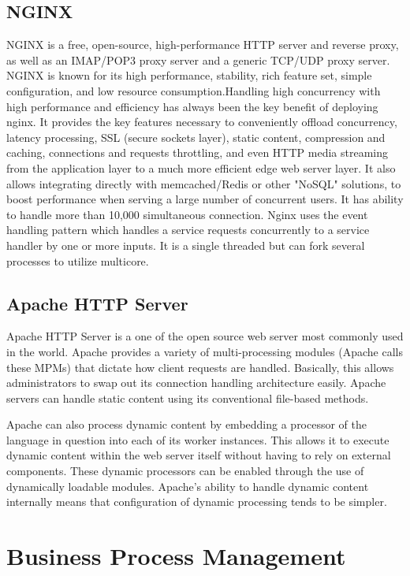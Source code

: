 \subsection{NGINX}
              NGINX is a free, open-source, high-performance HTTP server and reverse proxy, as well as an IMAP/POP3 proxy server and a generic TCP/UDP proxy server. NGINX is known for its high performance, stability, rich feature set, simple configuration, and low resource consumption.Handling high concurrency with high performance and efficiency has always been the key benefit of deploying nginx. It provides the key features necessary to conveniently offload concurrency, latency processing, SSL (secure sockets layer), static content, compression and caching, connections and requests throttling, and even HTTP media streaming from the application layer to a much more efficient edge web server layer. It also allows integrating directly with memcached/Redis or other "NoSQL" solutions, to boost performance when serving a large number of concurrent users. It has ability to handle more than 10,000 simultaneous connection. Nginx uses the event handling pattern which handles a service requests concurrently to a service handler by one or more inputs. It is a single threaded but can fork several processes to utilize multicore.
              

\subsection{Apache HTTP Server}
				Apache HTTP Server is a one of the open source web server most commonly used in the world. Apache provides a variety of multi-processing modules (Apache calls these MPMs) that dictate how client requests are handled. Basically, this allows administrators to swap out its connection handling architecture easily. Apache servers can handle static content using its conventional file-based methods. 
				
				Apache can also process dynamic content by embedding a processor of the language in question into each of its worker instances. This allows it to execute dynamic content within the web server itself without having to rely on external components. These dynamic processors can be enabled through the use of dynamically loadable modules. Apache's ability to handle dynamic content internally means that configuration of dynamic processing tends to be simpler. 				


\section{Business Process Management}
			
